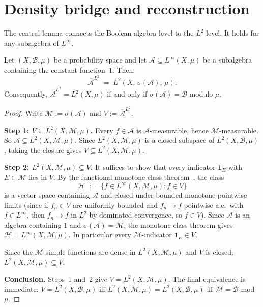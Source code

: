 \section{Density bridge and reconstruction}
\label{sec:density-bridge}

The central lemma connects the Boolean algebra level to the $L^2$ level.
It holds for any subalgebra of $L^\infty$.

\begin{lemma}
\label{lem:density-bridge}
Let $(X, \mathcal{B}, \mu)$ be a probability space and let
$\mathcal{A} \subseteq L^\infty(X, \mu)$ be a subalgebra containing the
constant function~$1$.  Then:
\[
  \overline{\mathcal{A}}^{L^2}
  \;=\;
  L^2(X,\, \sigma(\mathcal{A}),\, \mu).
\]
Consequently, $\overline{\mathcal{A}}^{L^2} = L^2(X, \mu)$ if and only if
$\sigma(\mathcal{A}) = \mathcal{B}$ modulo $\mu$.
\end{lemma}

\begin{proof}
Write $\mathcal{M} := \sigma(\mathcal{A})$ and $V := \overline{\mathcal{A}}^{L^2}$.

\textbf{Step 1: $V \subseteq L^2(X, \mathcal{M}, \mu)$.}
Every $f \in \mathcal{A}$ is $\mathcal{A}$-measurable, hence $\mathcal{M}$-measurable.
So $\mathcal{A} \subseteq L^2(X, \mathcal{M}, \mu)$.  Since $L^2(X, \mathcal{M}, \mu)$
is a closed subspace of $L^2(X, \mathcal{B}, \mu)$, taking the closure gives
$V \subseteq L^2(X, \mathcal{M}, \mu)$.

\textbf{Step 2: $L^2(X, \mathcal{M}, \mu) \subseteq V$.}
It suffices to show that every indicator $\mathbf{1}_E$ with $E \in \mathcal{M}$
lies in $V$.  By the functional monotone class theorem~\cite{Dynkin}, the
class
\[
  \mathcal{H}
  \;:=\;
  \bigl\{f \in L^\infty(X, \mathcal{M}, \mu) : f \in V\bigr\}
\]
is a vector space containing $\mathcal{A}$ and closed under bounded monotone
pointwise limits (since if $f_n \in V$ are uniformly bounded and $f_n \to f$
pointwise a.e.\ with $f \in L^\infty$, then $f_n \to f$ in $L^2$ by dominated
convergence, so $f \in V$).  Since $\mathcal{A}$ is an algebra containing $1$
and $\sigma(\mathcal{A}) = \mathcal{M}$, the monotone class theorem gives
$\mathcal{H} = L^\infty(X, \mathcal{M}, \mu)$.  In particular every
$\mathcal{M}$-indicator $\mathbf{1}_E \in V$.

Since the $\mathcal{M}$-simple functions are dense in $L^2(X, \mathcal{M}, \mu)$
and $V$ is closed, $L^2(X, \mathcal{M}, \mu) \subseteq V$.

\textbf{Conclusion.}
Steps~1 and~2 give $V = L^2(X, \mathcal{M}, \mu)$.  The final equivalence is
immediate: $V = L^2(X, \mathcal{B}, \mu)$ iff $L^2(X, \mathcal{M}, \mu) =
L^2(X, \mathcal{B}, \mu)$ iff $\mathcal{M} = \mathcal{B}$ mod $\mu$.
\end{proof}

